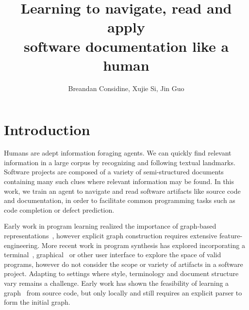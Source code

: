 \documentclass[11pt]{article}
\title{Learning to navigate, read and apply\\software documentation like a human}
\author{Breandan Considine, Xujie Si, Jin Guo}
\begin{document}
\maketitle

\section{Introduction}

Humans are adept information foraging agents. We can quickly find relevant information in a large corpus by recognizing and following textual landmarks. Software projects are composed of a variety of semi-structured documents containing many such clues where relevant information may be found. In this work, we train an agent to navigate and read software artifacts like source code and documentation, in order to facilitate common programming tasks such as code completion or defect prediction.


Early work in program learning realized the importance of graph-based representations~\cite{allamanis2017learning}, however explicit graph construction requires extensive feature-engineering. More recent work in program synthesis has explored incorporating a terminal~\cite{ellis2019write}, graphical~\cite{walke2020learning} or other user interface to explore the space of valid programs, however do not consider the scope or variety of artifacts in a software project. Adapting to settings where style, terminology and document structure vary remains a challenge. Early work has shown the feasibility of learning a graph~\cite{johnson2020learning} from source code, but only locally and still requires an explicit parser to form the initial graph.

\end{document}
